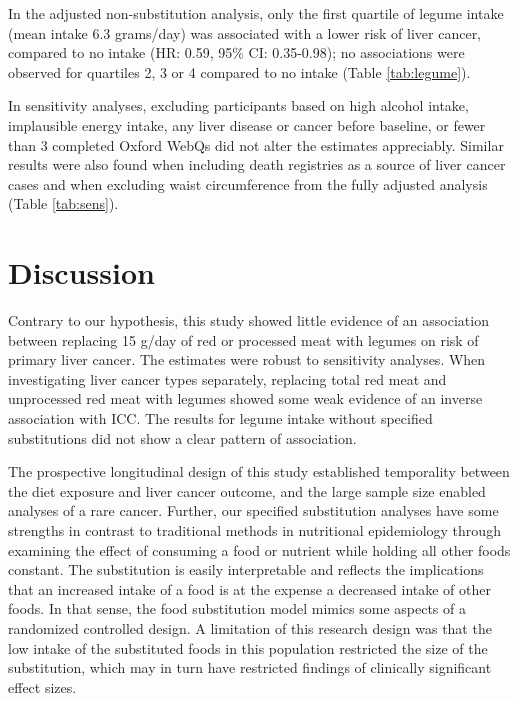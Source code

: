 \documentclass[nutrients,article,submit,moreauthors,pdftex]{Definitions/mdpi}
\begin{document}
In the adjusted non-substitution analysis, only the first quartile of
legume intake (mean intake 6.3 grams/day) was associated with a lower
risk of liver cancer, compared to no intake
(HR: 0.59, 95\% CI: 0.35-0.98);
no associations were observed for quartiles 2, 3 or 4 compared to no
intake (Table \ref{tab:legume}).

In sensitivity analyses, excluding participants based on high alcohol
intake, implausible energy intake, any liver disease or cancer before
baseline, or fewer than 3 completed Oxford WebQs did not alter the
estimates appreciably. Similar results were also found when including
death registries as a source of liver cancer cases and when excluding
waist circumference from the fully adjusted analysis (Table
\ref{tab:sens}).

\hypertarget{sec4}{%
\section{Discussion}\label{sec4}}

Contrary to our hypothesis, this study showed little evidence of an
association between replacing 15 g/day of red or processed meat with
legumes on risk of primary liver cancer. The estimates were robust to
sensitivity analyses. When investigating liver cancer types separately,
replacing total red meat and unprocessed red meat with legumes showed
some weak evidence of an inverse association with ICC. The results for
legume intake without specified substitutions did not show a clear
pattern of association.

The prospective longitudinal design of this study established
temporality between the diet exposure and liver cancer outcome, and the
large sample size enabled analyses of a rare cancer. Further, our
specified substitution analyses have some strengths in contrast to
traditional methods in nutritional epidemiology through examining the
effect of consuming a food or nutrient while holding all other foods
constant. The substitution is easily interpretable and reflects the
implications that an increased intake of a food is at the expense a
decreased intake of other foods. In that sense, the food substitution
model mimics some aspects of a randomized controlled design. A
limitation of this research design was that the low intake of the
substituted foods in this population restricted the size of the
substitution, which may in turn have restricted findings of clinically
significant effect sizes.
\end{document}
